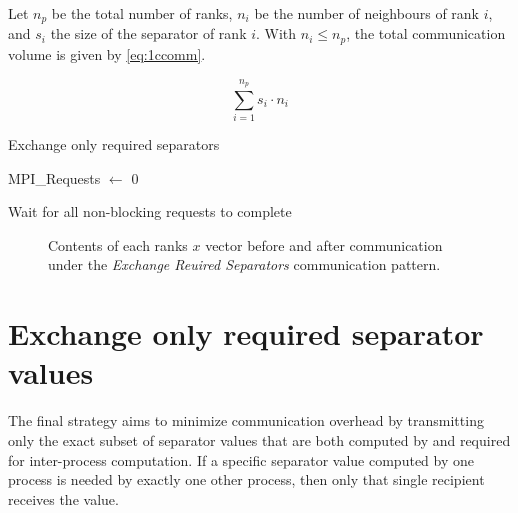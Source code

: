 Let \(n_{p}\) be the total number of ranks, \(n_{i}\) be the number of neighbours of rank \(i\), and \(s_{i}\) the size of the separator of rank \(i\). With \(n_{i} \leq n_{p}\), the total communication volume is given by \ref{eq:1ccomm}.

\begin{equation}
    \label{eq:1ccomm}
    \sum_{i=1}^{n_{p}} s_i \cdot  n_{i} 
\end{equation}

\begin{algorithm}[H]
    \label{alg:1ccomm}
    \caption{Exchange only required separators}
    \SetAlgoVlined
    \Output{\newline}

    MPI\_Requests \(\gets\) 0\\
 

    Wait for all non-blocking requests to complete\\
\end{algorithm}


\begin{figure}[ht]
    \centering
    \caption{Contents of each ranks \(x\) vector before and after communication under the \textit{Exchange Reuired Separators} communication pattern.}
    \label{fig:1ccomm}
\end{figure}

\section{Exchange only required separator values}
The final strategy aims to minimize communication overhead by transmitting only the exact subset of separator values that are both computed by and required for inter-process computation. If a specific separator value computed by one process is needed by exactly one other process, then only that single recipient receives the value.
\medskip


